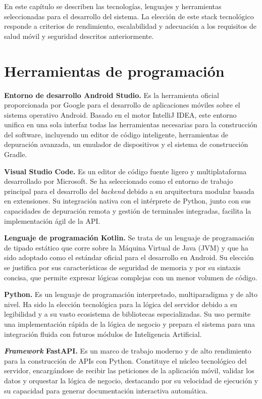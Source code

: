 
En este capítulo se describen las tecnologías, lenguajes y herramientas seleccionadas para el desarrollo del sistema. La elección de este stack tecnológico responde a criterios de rendimiento, escalabilidad y adecuación a los requisitos de salud móvil y seguridad descritos anteriormente.

\section{Herramientas de programación}

\textbf{Entorno de desarrollo Android Studio.} Es la herramienta oficial proporcionada por Google para el desarrollo de aplicaciones móviles sobre el sistema operativo Android. Basado en el motor IntelliJ IDEA, este entorno unifica en una sola interfaz todas las herramientas necesarias para la construcción del software, incluyendo un editor de código inteligente, herramientas de depuración avanzada, un emulador de dispositivos y el sistema de construcción Gradle. \cite{android_studio_intro}

\textbf{Visual Studio Code.} Es un editor de código fuente ligero y multiplataforma desarrollado por Microsoft. Se ha seleccionado como el entorno de trabajo principal para el desarrollo del \textit{backend} debido a su arquitectura modular basada en extensiones. Su integración nativa con el intérprete de Python, junto con sus capacidades de depuración remota y gestión de terminales integradas, facilita la implementación ágil de la API.

\textbf{Lenguaje de programación Kotlin.} Se trata de un lenguaje de programación de tipado estático que corre sobre la Máquina Virtual de Java (JVM) y que ha sido adoptado como el estándar oficial para el desarrollo en Android. Su elección se justifica por sus características de seguridad de memoria y por su sintaxis concisa, que permite expresar lógicas complejas con un menor volumen de código.  \cite{so_kotlin}

\textbf{Python.} Es un lenguaje de programación interpretado, multiparadigma y de alto nivel. Ha sido la elección tecnológica para la lógica del servidor debido a su legibilidad y a su vasto ecosistema de bibliotecas especializadas. Su uso permite una implementación rápida de la lógica de negocio y prepara el sistema para una integración fluida con futuros módulos de Inteligencia Artificial.  \cite{python_org}

\textbf{\textit{Framework} FastAPI.} Es un marco de trabajo moderno y de alto rendimiento para la construcción de APIs con Python. Constituye el núcleo tecnológico del servidor, encargándose de recibir las peticiones de la aplicación móvil, validar los datos y orquestar la lógica de negocio, destacando por su velocidad de ejecución y su capacidad para generar documentación interactiva automática.

